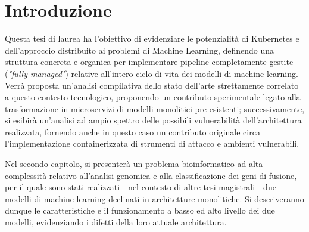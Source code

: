 % 
% 
% 



\clearpage
\cleardoublepage

\chapter{Introduzione}

Questa tesi di laurea ha l'obiettivo di evidenziare le potenzialità di Kubernetes e dell'approccio distribuito ai problemi di Machine Learning, definendo una struttura concreta e organica per implementare pipeline completamente gestite ({\em "fully-managed"}) relative all'intero ciclo di vita dei modelli di machine learning. Verrà proposta un'analisi compilativa dello stato dell'arte strettamente correlato a questo contesto tecnologico, proponendo un contributo sperimentale legato alla trasformazione in microservizi di modelli monolitici pre-esistenti; successivamente, si esibirà un'analisi ad ampio spettro delle possibili vulnerabilità dell'architettura realizzata, fornendo anche in questo caso un contributo originale circa l'implementazione containerizzata di strumenti di attacco e ambienti vulnerabili.

Nel secondo capitolo, si presenterà un problema bioinformatico ad alta complessità relativo all'analisi genomica e alla classificazione dei geni di fusione, per il quale sono stati realizzati - nel contesto di altre tesi magistrali - due modelli di machine learning declinati in architetture monolitiche. Si descriveranno dunque le caratteristiche e il funzionamento a basso ed alto livello dei due modelli, evidenziando i difetti della loro attuale architettura.

